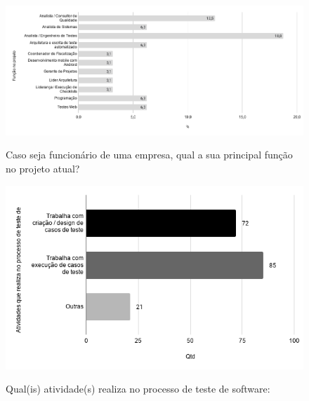         \begin{figure}[!htb]
        \centering
        \includegraphics[width=.90\textwidth]{images/s_funcaoprojeto.png}
        \label{figure:s_funcaoprojeto}
        \caption{Caso seja funcionário de uma empresa, qual a sua principal função no projeto atual?}
        \end{figure}
    
    
        \begin{figure}[!htb]
        \centering
        \includegraphics[width=.80\textwidth]{images/s_atividadesprojeto.png}
        \label{figure:s_atividadesprojeto}
        \caption{Qual(is) atividade(s) realiza no processo de teste de software:}
            \end{figure}   
    
